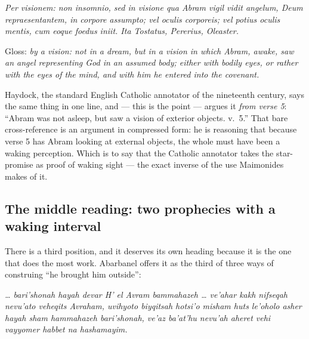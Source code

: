 \begin{studyframe}
\textit{Per visionem: non insomnio, sed in visione qua Abram vigil vidit
angelum, Deum repraesentantem, in corpore assumpto; vel oculis corporeis; vel
potius oculis mentis, cum eoque foedus iniit. Ita Tostatus, Pererius,
Oleaster.}
\end{studyframe}

\noindent Gloss: \emph{by a vision: not in a dream, but in a vision in which
Abram, awake, saw an angel representing God in an assumed body; either with
bodily eyes, or rather with the eyes of the mind, and with him he entered into
the covenant.}

Haydock, the standard English Catholic annotator of the nineteenth century, says
the same thing in one line, and --- this is the point --- argues it \emph{from
verse 5}: ``Abram was not asleep, but saw a vision of exterior objects.
v.~5.'' That bare cross-reference is an argument in
compressed form: he is reasoning that because verse 5 has Abram looking at
external objects, the whole must have been a waking perception. Which is to say
that the Catholic annotator takes the star-promise as proof of waking sight ---
the exact inverse of the use Maimonides makes of it.

\subsection{The middle reading: two prophecies with a waking interval}

There is a third position, and it deserves its own heading because it is the one
that does the most work. Abarbanel offers it as the third of three ways of
construing ``he brought him outside'':

\begin{studyframe}
\textit{\dots{} bari'shonah hayah devar H' el Avram bammahazeh \dots{} ve'ahar
kakh nifseqah nevu'ato veheqits Avraham, uvihyoto biyqitsah hotsi'o misham huts
le'oholo asher hayah sham hammahazeh bari'shonah, ve'az ba'at'hu nevu'ah aheret
vehi vayyomer habbet na hashamayim.}
\end{studyframe}

